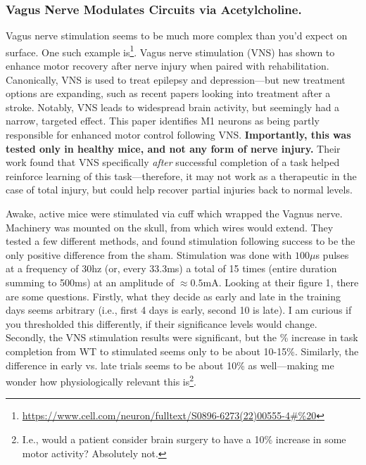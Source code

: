 \documentclass[12pt]{report}
\begin{document}
\subsubsection{Vagus Nerve Modulates Circuits via Acetylcholine.}

Vagus nerve stimulation seems to be much more complex than you'd expect on surface. One such example is\footnote{\url{https://www.cell.com/neuron/fulltext/S0896-6273(22)00555-4\#\%20}}. Vagus nerve stimulation (VNS) has shown to enhance motor recovery after nerve injury when paired with rehabilitation. Canonically, VNS is used to treat epilepsy and depression---but new treatment options are expanding, such as recent papers looking into treatment after a stroke. Notably, VNS leads to widespread brain activity, but seemingly had a narrow, targeted effect. This paper identifies M1 neurons as being partly responsible for enhanced motor control following VNS. \textbf{Importantly, this was tested only in healthy mice, and not any form of nerve injury.} Their work found that VNS specifically \textit{after} successful completion of a task helped reinforce learning of this task---therefore, it may not work as a therapeutic in the case of total injury, but could help recover partial injuries back to normal levels.\newline

Awake, active mice were stimulated via cuff which wrapped the Vagnus nerve. Machinery was mounted on the skull, from which wires would extend. They tested a few different methods, and found stimulation following success to be the only positive difference from the sham. Stimulation was done with $100\mu$s pulses at a frequency of 30hz (or, every 33.3ms) a total of 15 times (entire duration summing to 500ms) at an amplitude of $\approx 0.5$mA. Looking at their figure 1, there are some questions. Firstly, what they decide as early and late in the training days seems arbitrary (i.e., first 4 days is early, second 10 is late). I am curious if you thresholded this differently, if their significance levels would change. Secondly, the VNS stimulation results were significant, but the \% increase in task completion from WT to stimulated seems only to be about 10-15\%. Similarly, the difference in early vs. late trials seems to be about 10\% as well---making me wonder how physiologically relevant this is\footnote{I.e., would a patient consider brain surgery to have a 10\% increase in some motor activity? Absolutely not.}.\newline
\end{document}
